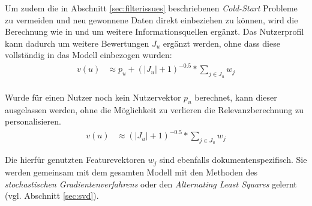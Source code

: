 Um zudem die in Abschnitt \ref{sec:filterissues} beschriebenen \textit{Cold-Start} Probleme zu vermeiden und neu gewonnene Daten direkt einbeziehen zu können, wird die Berechnung wie in \citep{Paterek07} und \citep{Koren:2009:MFT:1608565.1608614} um weitere Informationsquellen ergänzt. Das Nutzerprofil kann dadurch um weitere Bewertungen $J_u$ ergänzt werden, ohne dass diese vollständig in das Modell einbezogen wurden:
\begin{align}
v(u) & \approx p_u  +(|J_u|+1)^{-0.5}*\sum_{j \in J_u} w_{j} \label{form:anonuser} \\
\end{align}

Wurde für einen Nutzer noch kein Nutzervektor $p_u$ berechnet, kann dieser ausgelassen werden, ohne die Möglichkeit zu verlieren die Relevanzberechnung zu personalisieren.
\begin{align}
v(u) & \approx (|J_u|+1)^{-0.5}*\sum_{j \in J_u} w_{j} \label{form:anonuser}
\end{align}

Die hierfür genutzten Featurevektoren $w_j$ sind ebenfalls dokumentenspezifisch. Sie werden gemeinsam mit dem gesamten Modell mit den Methoden des \textit{stochastischen Gradientenverfahrens} oder den \textit{Alternating Least Squares} gelernt (vgl. Abschnitt \ref{sec:svd}).  \citep{Paterek07,Koren:2009:MFT:1608565.1608614} \newpage